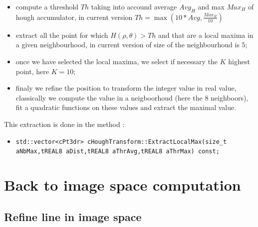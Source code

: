 \begin{itemize}
    \item  compute a threshold $Th$  taking into accound average $Avg_H$ and max $Max_H$ of hough accumulator,
           in current version $Th = \max (10*Avg, \frac{Max_H}{10})$
    \item  extract all the point for which $H(\rho,\theta) > Th$ and that are a local maxima in a 
           given neighbourhood, in current version of size of the neighbourhoud is $5$;

     \item once we  have selected the local maxima, we select if necessary the $K$  highest point, here $K=10$;

     \item finaly we refine the position to transform the integer value in real value, classically we compute
           the value in a neigboorhoud (here the $8$ neighboors), fit a quadratic functions on these values
           and extract  the maximal value.
\end{itemize}

This extraction is done in the method :

\begin{itemize}
   \item {\tt std::vector<cPt3dr>  cHoughTransform::ExtractLocalMax(size\_t aNbMax,tREAL8 aDist,tREAL8 aThrAvg,tREAL8 aThrMax) const;}

\end{itemize}



\section{Back to image space computation}


\subsection{Refine line in image space} 

